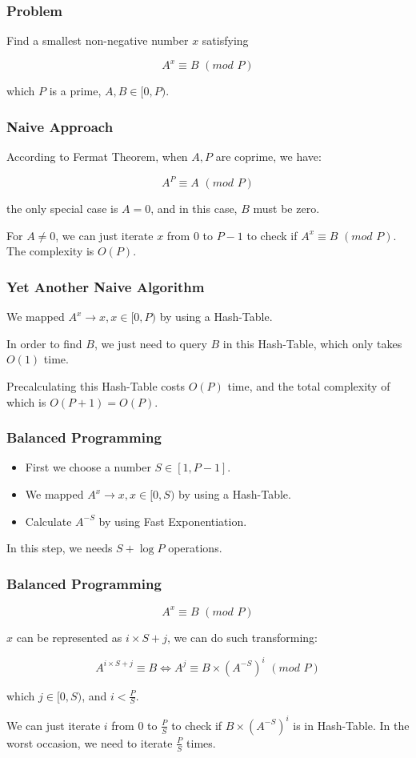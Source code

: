 \begin{frame}
\frametitle{Problem}
Find a smallest non-negative number $x$ satisfying

\[A^x \equiv B\,\,(mod\,\,P)\]

which $P$ is a prime, $A, B \in [0, P)$.
\end{frame}
\begin{frame}
\frametitle{Naive Approach}
According to Fermat Theorem, when $A, P$ are coprime, we have:

\[A^{P} \equiv A\,\,(mod\,\,P)\]

the only special case is $A = 0$, and in this case, $B$ must be zero.

\bigskip
For $A \neq 0$, we can just iterate $x$ from 0 to $P - 1$ to check if $A^x \equiv B\,\,(mod\,\,P)$.
The complexity is $O(P)$.


\end{frame}
\begin{frame}
\frametitle{Yet Another Naive Algorithm}
We mapped $A^{x} \rightarrow x, x \in [0, P)$ by using a Hash-Table.

\bigskip
In order to find $B$, we just need to query $B$ in this Hash-Table, which only takes $O(1)$ time.

\bigskip
Precalculating this Hash-Table costs $O(P)$ time, and the total complexity of which is $O(P + 1) = O(P)$.
\end{frame}

\begin{frame}
\frametitle{Balanced Programming}
\begin{itemize}
\item First we choose a number $S \in [1, P - 1]$.
\item We mapped $A^{x} \rightarrow x, x \in [0, S)$ by using a Hash-Table.
\item Calculate $A^{-S}$ by using Fast Exponentiation.
\end{itemize}

\bigskip
In this step, we needs $S + \log P$ operations.
\end{frame}

\begin{frame}
\frametitle{Balanced Programming}

\[A^x \equiv B\,\,(mod\,\,P)\]

$x$ can be represented as $i\times S + j$, we can do such transforming:

\[A^{i\times S + j} \equiv B \Leftrightarrow A^{j} \equiv B \times (A^{-S})^{i}\,\,(mod\,\,P)\]

which $j \in [0, S)$, and $i < \frac{P}{S}$.

\bigskip
We can just iterate $i$ from 0 to $\frac{P}{S}$ to check if $B \times (A^{-S})^{i}$ is in Hash-Table. In the worst occasion, we need to iterate $\frac{P}{S}$ times.
\end{frame}

